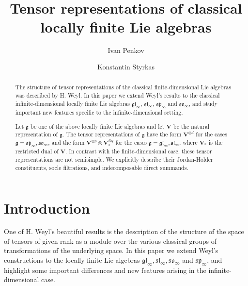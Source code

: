 \documentclass[12pt,reqno]{amsart}
\numberwithin{equation}{section}
\theoremstyle{plain}
\theoremstyle{definition}
\def\gl{\mathfrak{gl}}
\def\sl{\mathfrak{sl}}
\def\so{\mathfrak{so}}
\def\sp{\mathfrak{sp}}
\def\o{\otimes}
\def\g{\mathfrak g}
\def\VV{\mathbf V}
\begin{document}
\title[Tensor representations of classical locally finite Lie
algebras] {Tensor representations of classical \\ locally finite Lie
algebras }

\author{Ivan Penkov}
\author{Konstantin Styrkas}

\address{Jacobs University Bremen, Bremen 28759, Germany}

\maketitle




\begin{abstract}

The structure of tensor representations of the classical
finite-dimensional Lie algebras was described by H. Weyl. In this
paper we extend Weyl's results to the classical infinite-dimensional
locally finite Lie algebras $\gl_\infty$, $\sl_\infty$, $\sp_\infty$
and $\so_\infty$, and study important new features specific to the
infinite-dimensional setting.

Let $\g$ be one of the above locally finite Lie algebras and let $\VV$ be the
natural representation of $\g$. The tensor representations of $\g$
have the form $\VV^{\o d}$ for the cases $\g =
\sp_\infty,\so_\infty$, and the form $\VV^{\o p}\o \VV_*^{\o q}$ for
the cases $\g = \gl_\infty,\sl_\infty$, where $\VV_*$ is the
restricted dual of $\VV$. In contrast with the finite-dimensional
case, these tensor representations are not semisimple. We explicitly
describe their Jordan-H\"older constituents, socle filtrations, and
indecomposable direct summands.
\end{abstract}






\setcounter{section}{-1}




\section{Introduction}


One of H. Weyl's beautiful results is the description of the
structure of the space of tensors of given rank as a module over the
various classical groups of transformations of the underlying space. In this
paper we extend Weyl's constructions to the locally-finite
Lie algebras $\gl_\infty, \sl_\infty, \so_\infty$ and $\sp_\infty$,
and highlight some important differences and new features arising
in the infinite-dimensional case.
\end{document}
